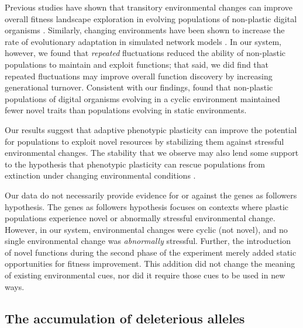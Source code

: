 \begin{raggedbottom}
Previous studies have shown that transitory environmental changes can improve overall fitness landscape exploration in evolving populations of non-plastic digital organisms \citep{nahum_improved_2017}.
Similarly, changing environments have been shown to increase the rate of evolutionary adaptation in simulated network models \citep{kashtan2007varying}.
In our system, however, we found that \textit{repeated} fluctuations reduced the ability of non-plastic populations to maintain and exploit functions; that said, we did find that repeated fluctuations may improve overall function discovery by increasing generational turnover.
Consistent with our findings, \cite{canino-koning_fluctuating_2019} found that non-plastic populations of digital organisms evolving in a cyclic environment maintained fewer novel traits than populations evolving in static environments.

Our results suggest that adaptive phenotypic plasticity can improve the potential for populations to exploit novel resources by stabilizing them against stressful environmental changes.
The stability that we observe may also lend some support to the hypothesis that phenotypic plasticity can rescue populations from extinction under changing environmental conditions \citep{chevin_adaptation_2010}.

Our data do not necessarily provide evidence for or against the genes as followers hypothesis.
The genes as followers hypothesis focuses on contexts where plastic populations experience novel or abnormally stressful environmental change.
However, in our system, environmental changes were cyclic (not novel), and no single environmental change was \textit{abnormally} stressful.
Further, the introduction of novel functions during the second phase of the experiment merely added static opportunities for fitness improvement.
This addition did not change the meaning of existing environmental cues, nor did it require those cues to be used in new ways.

\subsection{The accumulation of deleterious alleles}


\end{raggedbottom}
